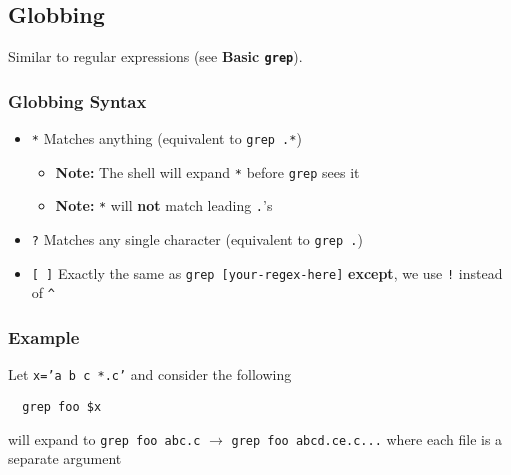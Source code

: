 \documentclass[13pt]{article}
\begin{document}
\subsection{Globbing}
Similar to regular expressions (see \textbf{Basic \texttt{grep}}).
\subsubsection{Globbing Syntax}
\begin{itemize}[leftmargin = 0pt]
\item [] \texttt{*} Matches anything (equivalent to \texttt{grep .*})
  \begin{itemize}[leftmargin = 0pt]
  \item [] \textbf{Note:} The shell will expand \texttt{*} before \texttt{grep} sees it
  \item [] \textbf{Note:} \texttt{*} will \textbf{not} match leading \texttt{.}'s
  \end{itemize}
\item [] \texttt{?} Matches any single character (equivalent to \texttt{grep .})
\item [] \texttt{[ ]} Exactly the same as \texttt{grep [your-regex-here]} \textbf{except}, we use \texttt{!} instead of \texttt{\^}
\end{itemize}

\subsubsection*{Example}
Let \texttt{x='a b c *.c'} and consider the following
\begin{verbatim}
  grep foo $x
\end{verbatim}
will expand to \texttt{grep foo a\textvisiblespace b\textvisiblespace c\textvisiblespace *.c} $\rightarrow$ \texttt{grep foo a\textvisiblespace b\textvisiblespace c\textvisiblespace d.c\textvisiblespace e.c\textvisiblespace ...} where each file is a separate argument
\end{document}
